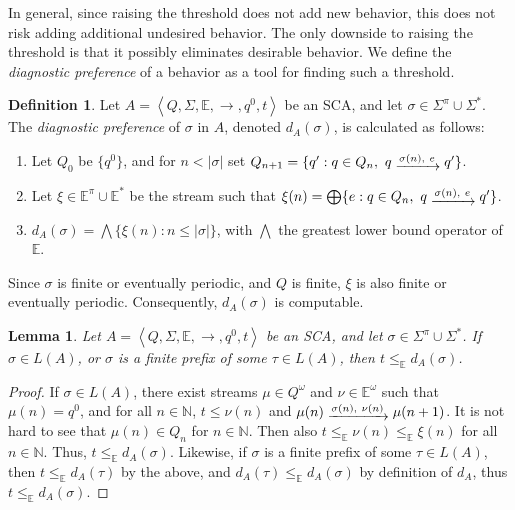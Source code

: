 \documentclass[a4paper]{article}
\newcommand{\naturals}{\mathbb{N}}
\newcommand{\angl}[1]{\left\langle#1\right\rangle}
\newcommand{\myrightarrow}[1]{\mathrel{\raisebox{-3pt}{$\xrightarrow{#1}$}}}
\newcommand{\abscsemiring}{\mathbb{E}}
\newtheorem{lemma}{Lemma}
\theoremstyle{definition}
\newtheorem{definition}{Definition}
\begin{document}
In general, since raising the threshold does not add new behavior, this does not risk adding additional undesired behavior. The only downside to raising the threshold is that it possibly eliminates desirable behavior. We define the \emph{diagnostic preference} of a behavior as a tool for finding such a threshold.

\begin{definition}
Let $A = \angl{Q, \Sigma, \abscsemiring, \rightarrow, q^0, t}$ be an SCA, and let $\sigma \in \Sigma^\pi \cup \Sigma^*$. The \emph{diagnostic preference} of $\sigma$ in $A$, denoted $d_A(\sigma)$, is calculated as follows:
\begin{enumerate}
    \item Let $Q_0$ be $\{ q^0 \}$, and for $n < |\sigma|$ set $Q_{n+1} = \{ q' : q \in Q_n,\ q \myrightarrow{\sigma(n),\ e} q' \}$.
    \item Let $\xi \in \abscsemiring^\pi \cup \abscsemiring^*$ be the stream such that $\xi(n) = \bigoplus \{ e : q \in Q_n,\ q \myrightarrow{\sigma(n),\ e} q' \}$.
    \item $d_A(\sigma) = \bigwedge \{ \xi(n) : n \leq |\sigma| \}$, with $\bigwedge$ the greatest lower bound operator of $\abscsemiring$.
\end{enumerate}
\end{definition}

Since $\sigma$ is finite or eventually periodic, and $Q$ is finite, $\xi$ is also finite or eventually periodic. Consequently, $d_A(\sigma)$ is computable.

\begin{lemma}%
\label{lemma:diagnostic-preference-bound}
Let $A = \angl{Q, \Sigma, \abscsemiring, \rightarrow, q^0, t}$ be an SCA, and let $\sigma \in \Sigma^\pi \cup \Sigma^*$. If $\sigma \in L(A)$, or $\sigma$ is a finite prefix of some $\tau \in L(A)$, then $t \leq_\abscsemiring d_A(\sigma)$.
\end{lemma}
\begin{proof}
If $\sigma \in L(A)$, there exist streams $\mu \in Q^\omega$ and $\nu \in \abscsemiring^\omega$ such that $\mu(n) = q^0$, and for all $n \in \naturals$, $t \leq \nu(n)$ and $\mu(n) \myrightarrow{\sigma(n),\ \nu(n)} \mu(n+1)$. It is not hard to see that $\mu(n) \in Q_n$ for $n \in \naturals$. Then also $t \mathrel{\leq_\abscsemiring} \nu(n) \mathrel{\leq_\abscsemiring} \xi(n)$ for all $n \in \naturals$. Thus, $t \leq_\abscsemiring d_A(\sigma)$. Likewise, if $\sigma$ is a finite prefix of some $\tau \in L(A)$, then $t \leq_\abscsemiring d_A(\tau)$ by the above, and $d_A(\tau) \leq_\abscsemiring d_A(\sigma)$ by definition of $d_A$, thus $t \leq_\abscsemiring d_A(\sigma)$.
\end{proof}
\end{document}

